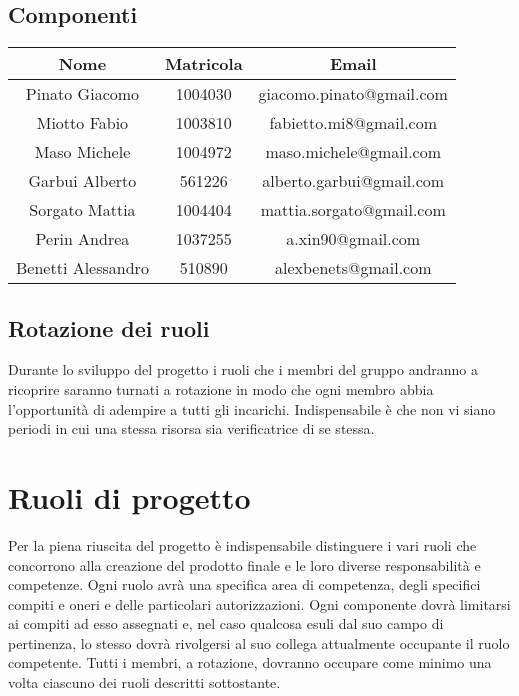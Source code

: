 \subsection{Componenti}
\label{1.4}
\begin{center}
\begin{longtable}{|c|c|c|}
\toprule
\textbf{Nome} & \textbf{Matricola} & \textbf{Email}\\
\midrule
Pinato Giacomo & 1004030 & giacomo.pinato@gmail.com
\\
Miotto Fabio & 1003810 & fabietto.mi8@gmail.com\\
Maso Michele & 1004972 & maso.michele@gmail.com
\\
Garbui Alberto & 561226 & alberto.garbui@gmail.com\\
Sorgato Mattia & 1004404 & mattia.sorgato@gmail.com \\
Perin Andrea & 1037255 & a.xin90@gmail.com\\
Benetti Alessandro & 510890 & alexbenets@gmail.com\\
\bottomrule
\end{longtable}
\end{center} 

\subsection{Rotazione dei ruoli}
\label{1.5}
Durante lo sviluppo del progetto i ruoli che i membri del gruppo andranno a ricoprire saranno turnati a rotazione in modo che ogni membro abbia l'opportunità di adempire a tutti gli incarichi. Indispensabile è che non vi siano periodi in cui una stessa risorsa sia verificatrice di se stessa.

\newpage
\section{Ruoli di progetto}
\label{2.0}
Per la piena riuscita del progetto è indispensabile distinguere i vari ruoli che concorrono alla creazione del prodotto finale e le loro diverse responsabilità e competenze.
Ogni ruolo avrà una specifica area di competenza, degli specifici compiti e oneri e delle particolari autorizzazioni. Ogni componente dovrà limitarsi ai compiti ad esso assegnati e, nel caso qualcosa esuli dal suo campo di pertinenza, lo stesso dovrà rivolgersi al suo collega attualmente occupante il ruolo competente.
Tutti i membri, a rotazione, dovranno occupare come minimo una volta ciascuno dei ruoli descritti sottostante.

